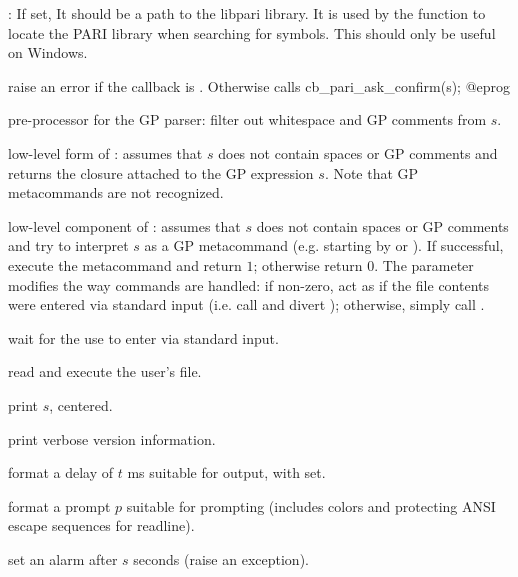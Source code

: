
: If set, It should be a path to the libpari library.
It is used by the function  to locate the PARI library when
searching for symbols.  This should only be useful on Windows.


 raise an error if the
callback  is . Otherwise
calls
\bprog
  cb_pari_ask_confirm(s);
@eprog

 pre-processor for the GP
parser: filter out whitespace and GP comments from $s$.

 low-level form of
: assumes that $s$ does not contain spaces or GP comments and
returns the closure attached to the GP expression $s$. Note
that GP metacommands are not recognized.

 low-level component of
: assumes that $s$ does not contain spaces or GP comments and
try to interpret $s$ as a GP metacommand (e.g. starting by \kbd{\bs} or
). If successful, execute the metacommand and return $1$; otherwise
return $0$. The  parameter modifies the way  commands
are handled: if non-zero, act as if the file contents were entered via
standard input (i.e. call  and divert );
otherwise, simply call .

 wait for the use to enter 
via standard input.

 read and execute the user's  file.

 print $s$, centered.

 print verbose version information.

 format a delay of $t$ ms
suitable for  output, with  set.

 format a prompt $p$
suitable for  prompting (includes colors and protecting ANSI escape
sequences for readline).

 set an alarm after $s$ seconds (raise an
 exception).

